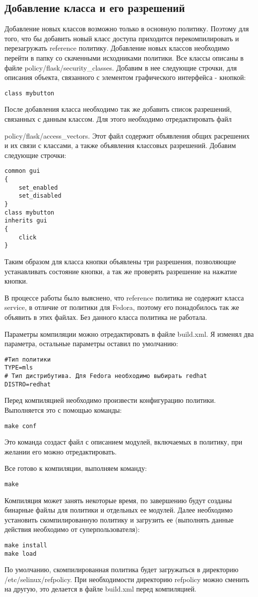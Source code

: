 \documentclass{./../class/UIR}
\begin{document}
	\subsection{Добавление класса и его разрешений}
	Добавление новых классов возможно только в основную политику. Поэтому для того,
	что бы добавить новый класс доступа приходится перекомпилировать и
	перезагружать reference политику.
	Добавление новых классов необходимо перейти в папку со скаченными исходниками
	политики. Все классы описаны в файле policy/flask/security\_classes. Добавим в
	нее следующие строчки, для описания объекта, связанного с элементом графического
	интерфейса - кнопкой:
\begin{verbatim}
class mybutton
\end{verbatim}
	После добавления класса необходимо так же добавить список разрешений, связанных
	с данным классом. Для этого необходимо отредактировать файл
	
	policy/flask/access\_vectors. Этот файл содержит объявления общих расрешених и
	их связи с классами, а также объявления классовых разрешений. Добавим следующие
	строчки:
\begin{verbatim}
common gui
{
    set_enabled
    set_disabled
}
class mybutton
inherits gui
{
    click
}
\end{verbatim}	
	Таким образом для класса кнопки объявлены три разрешения, позволяющие
	устанавливать состояние кнопки, а так же проверять разрешение на нажатие
	кнопки.
	
	В процессе работы было выяснено, что reference политика не содержит класса
	service, в отличие от политики для Fedora, поэтому его понадобилось так же
	объявить в этих файлах. Без данного класса политика не работала.
	
	Параметры компиляции можно отредактировать в файле build.xml.
	Я изменял два параметра, остальные параметры оставил по умолчанию:
\begin{verbatim}
#Тип политики
TYPE=mls
# Тип дистрибутива. Для Fedora необходимо выбирать redhat
DISTRO=redhat
\end{verbatim}
    Перед компиляцией необходимо произвести конфигурацию политики. Выполняется
    это с помощью команды:
\begin{verbatim}
make conf
\end{verbatim}
	Это команда создаст файл с описанием модулей, включаемых в политику, при
	желании его можно отредактировать.
	
	Все готово к компиляции, выполняем команду:
\begin{verbatim}
make
\end{verbatim}
	Компиляция может занять некоторые время, по завершению будут созданы бинарные
	файлы для политики и отдельных ее модулей. Далее необходимо установить
	скомпилированную политику и загрузить ее (выполнять данные действия необходимо
	от суперпользователя):
\begin{verbatim}
make install
make load
\end{verbatim}
	По умолчанию, скомпилированная политика будет загружаться в директорию
	/etc/selinux/refpolicy. При необходимости директорию refpolicy можно сменить на
	другую, это делается в файле build.xml перед компиляцией.
	
\end{document}
